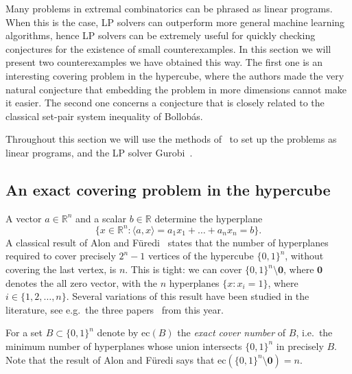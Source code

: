 \documentclass[11pt,english]{article}
\theoremstyle{plain}
\theoremstyle{remark}
\begin{document}
Many problems in extremal combinatorics can be phrased as linear programs. When this is the case, LP solvers can outperform more general machine learning algorithms, hence LP solvers can be extremely useful for quickly checking conjectures for the existence of small counterexamples. In this section we will present two counterexamples we have obtained this way. The first one is an interesting covering problem in the hypercube, where the authors made the very natural conjecture that embedding the problem in more dimensions cannot make it easier. The second one concerns a conjecture that is closely related to the classical set-pair system inequality of Bollob\'as.

Throughout this section we will use the methods of~\cite{mypaper} to set up the problems as linear programs, and the LP solver Gurobi~\cite{gurobi}.


\subsection{An exact covering problem in the hypercube}\label{subsec:carla}

A vector $a\in \mathbb{R}^n$ and a scalar $b\in \mathbb{R}$ determine the hyperplane $$\{x\in \mathbb{R}^n : \langle a,x \rangle = a_1x_1 + \ldots + a_nx_n = b  \}.$$
A classical result of Alon and F\"uredi~\cite{alon1993covering} states that the number of hyperplanes required to cover precisely $2^{n}-1$ vertices of the hypercube $\{0,1\}^n$, without covering the last vertex, is $n$. This is tight: we can cover $\{0,1\}^n\setminus \textbf{0}$, where $\textbf{0}$ denotes the all zero vector, with the $n$ hyperplanes $\{x:x_i = 1\}$, where $i\in\{1,2,\ldots, n\}$. Several variations of this result have been studied in the literature, see e.g.~the three papers~\cite{aaronson,bishnoi,sauermann} from this year.

For a set $B\subset \{0,1\}^n$ denote by $\text{ec}(B)$ the \emph{exact cover number} of $B$, i.e.~the minimum number of hyperplanes whose union intersects $\{0,1\}^n$ in precisely $B$. Note that the result of Alon and F\"uredi says that $\text{ec}(\{0,1\}^n\setminus \textbf{0})=n$.
\end{document}
